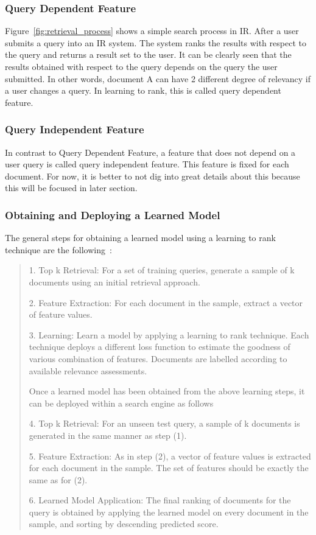 \subsubsection{Query Dependent Feature}
Figure~\ref{fig:retrieval_process} shows a simple search process in IR. After a user submits a query into an IR system. The system ranks the results 
with respect to the query and returns a result set to the user. It can be clearly seen that the results obtained with respect to the query depends on the 
query the user submitted. In other words, document A can have 2 different degree of relevancy if a user changes a query.
In learning to rank, this is called query dependent feature.

\subsubsection{Query Independent Feature}
In contrast to Query Dependent Feature, a feature that does not depend on a user query is called query independent feature. This feature is fixed for each
document. For now, it is better to not dig into great details about this because this will be focused in later section.

\subsubsection{Obtaining and Deploying a Learned Model} \label{section:learnedmodel}
The general steps for obtaining a learned model using a learning to rank technique are the following~\cite[P. 4]{learningmodel}:

\begin{quote}
  \item 1. Top k Retrieval: For a set of training queries, generate a sample of k documents using an initial retrieval approach.
  \item 2. Feature Extraction: For each document in the sample, extract a vector of feature values. 
  \item 3. Learning: Learn a model by applying a learning to rank technique. Each technique deploys a different loss function to estimate the goodness of
	various combination of features. Documents are labelled according to available relevance assessments.

Once a learned model has been obtained from the above learning steps, it can be deployed within a search engine as follows~\cite[P. 4]{learningmodel}

 \item 4. Top k Retrieval: For an unseen test query, a sample of k documents is generated in the same manner as step (1).
 \item 5. Feature Extraction: As in step (2), a vector of feature values is extracted for each document in the sample. The set of features should be exactly
	the same as for (2).
 \item 6. Learned Model Application: The final ranking of documents for the query is obtained by applying the learned model on every document in the sample,
	and sorting by descending predicted score.
\end{quote}


